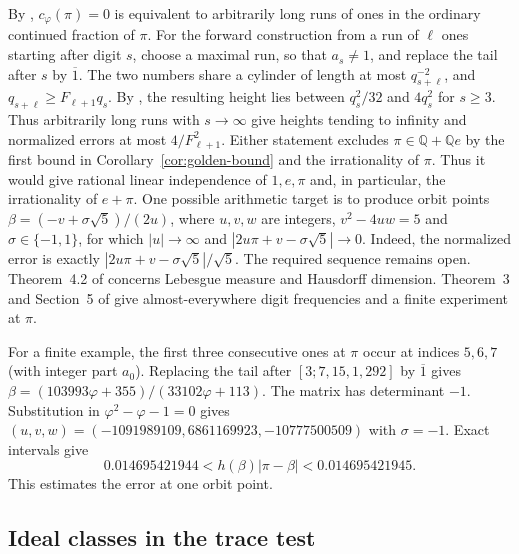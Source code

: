 \documentclass[11pt]{amsart}
\theoremstyle{definition}
\theoremstyle{remark}
\numberwithin{equation}{section}
\newcommand{\Q}{\mathbb{Q}}
\begin{document}
By \cite[Lemma~4.1]{BugeaudQuad}, $c_\varphi(\pi)=0$ is equivalent to
arbitrarily long runs of ones in the ordinary continued fraction of $\pi$.
For the forward construction from a run of $\ell$ ones starting after
digit $s$, choose a maximal run, so that $a_s\ne1$, and replace the
tail after $s$ by $\overline{1}$. The two numbers share a cylinder
of length at most $q_{s+\ell}^{-2}$, and
$q_{s+\ell}\ge F_{\ell+1}q_s$.
By \cite[Lemma~2.1]{BugeaudQuad}, the resulting height lies between
$q_s^2/32$ and $4q_s^2$ for $s\ge3$. Thus arbitrarily long runs with
$s\to\infty$ give heights tending to infinity and normalized errors
at most $4/F_{\ell+1}^2$.
Either statement excludes $\pi\in\Q+\Q e$ by the first bound in
Corollary~\ref{cor:golden-bound} and the irrationality of $\pi$.
Thus it would give rational linear independence of $1,e,\pi$ and,
in particular, the irrationality of $e+\pi$.
One possible arithmetic target is to produce orbit points
$\beta=(-v+\sigma\sqrt5)/(2u)$, where $u,v,w$ are integers,
$v^2-4uw=5$ and $\sigma\in\{-1,1\}$, for which $|u|\to\infty$ and
$|2u\pi+v-\sigma\sqrt5|\to0$. Indeed, the normalized error is exactly
$|2u\pi+v-\sigma\sqrt5|/\sqrt5$. The required sequence remains open.
Theorem~4.2 of \cite{BugeaudQuad} concerns Lebesgue measure and
Hausdorff dimension. Theorem~3 and Section~5 of \cite{Hildebrand2024}
give almost-everywhere digit frequencies and a finite experiment at $\pi$.

For a finite example, the first three consecutive ones at $\pi$ occur
at indices $5,6,7$ (with integer part $a_0$).
Replacing the tail after $[3;7,15,1,292]$ by $\overline{1}$ gives
$\beta=(103993\varphi+355)/(33102\varphi+113)$. The matrix has
determinant $-1$. Substitution in $\varphi^2-\varphi-1=0$ gives
$(u,v,w)=(-1091989109,6861169923,-10777500509)$ with $\sigma=-1$.
Exact intervals give
\[
  0.014695421944 < h(\beta)|\pi-\beta| < 0.014695421945 .
\]
This estimates the error at one orbit point.

\subsection{Ideal classes in the trace test}
\end{document}
